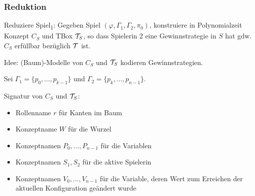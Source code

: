 \subsubsection{Reduktion}\label{reduktion}

Reduziere Spiel\textsubscript{1}: Gegeben Spiel
$\left( \varphi,\Gamma_1,\Gamma_2,\pi_{0} \right)$, konstruiere in
Polynomialzeit Konzept $C_{S}$ und TBox $\mathcal{T}_{S}$, so dass Spielerin 2 eine Gewinnstrategie in $S$ hat gdw. $C_S$ erfüllbar bezüglich $\mathcal{T}$ ist.

Idee: (Baum)-Modelle von $C_S$ und $\mathcal{T}_S$ kodieren Gewinnstrategien.

Sei $\Gamma_1 = \{p_0,\ldots,p_{k - 1}\}$ und $\Gamma_2 = \{p_k, \ldots, p_{n - 1}\}$.

Signatur von $C_S$ und $\mathcal{T}_S$:
\begin{itemize}
    \item Rollenname $r$ für Kanten im Baum
    \item Konzeptname $W$ für die Wurzel
    \item Konzeptnamen $P_0, \ldots, P_{n - 1}$ für die Variablen
    \item Konzeptnamen $S_1, S_2$ für die aktive Spielerin
    \item Konzeptnamen $V_0, \ldots, V_{n - 1}$ für die Variable, deren Wert zum Erreichen der aktuellen Konfiguration geändert wurde
\end{itemize}

